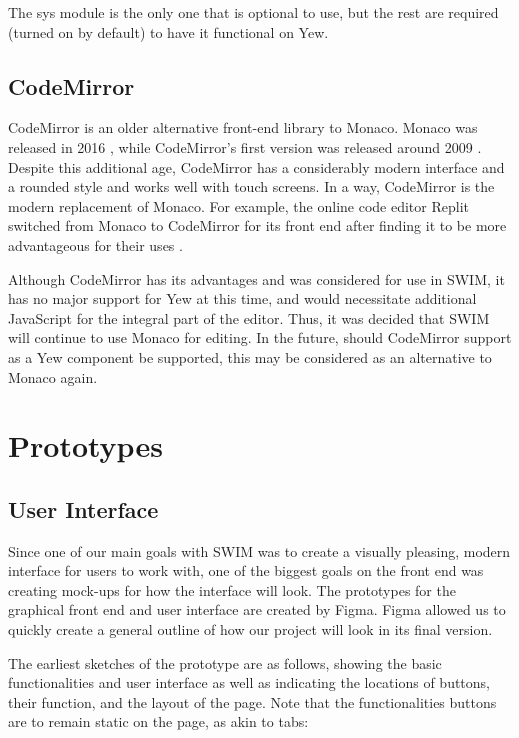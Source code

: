 \documentclass[
    paper=letter,
    parskip=half,
    fontsize=12pt,
    titlepage=firstiscover,
    toc=bibliography,
    numbers=endperiod
]{scrartcl}
\let\oldsection\section
\renewcommand{\section}{\newpage\oldsection}
\begin{document}
The sys module is the only one that is optional to use, but the rest are
required (turned on by default) to have it functional on Yew.

\subsection{CodeMirror}

CodeMirror is an older alternative front-end library to Monaco. Monaco
was released in 2016 \cite{monaco-changelog}, while CodeMirror's first
version was released around 2009 \cite{codemirror-changelog}. Despite
this additional age, CodeMirror has a considerably modern interface and
a rounded style and works well with touch screens. In a way, CodeMirror
is the modern replacement of Monaco. For example, the online code editor
Replit switched from Monaco to CodeMirror for its front end after
finding it to be more advantageous for their uses
\cite{replit-code-editors}.

Although CodeMirror has its advantages and was considered for use in
SWIM, it has no major support for Yew at this time, and would
necessitate additional JavaScript for the integral part of the editor.
Thus, it was decided that SWIM will continue to use Monaco for editing.
In the future, should CodeMirror support as a Yew component be
supported, this may be considered as an alternative to Monaco again.

\section{Prototypes}

\subsection{User Interface}

Since one of our main goals with SWIM was to create a visually pleasing,
modern interface for users to work with, one of the biggest goals on the
front end was creating mock-ups for how the interface will look. The
prototypes for the graphical front end and user interface are created by
Figma. Figma allowed us to quickly create a general outline of how our
project will look in its final version.

The earliest sketches of the prototype are as follows, showing the basic
functionalities and user interface as well as indicating the locations
of buttons, their function, and the layout of the page. Note that the
functionalities buttons are to remain static on the page, as akin to
tabs:
\end{document}
